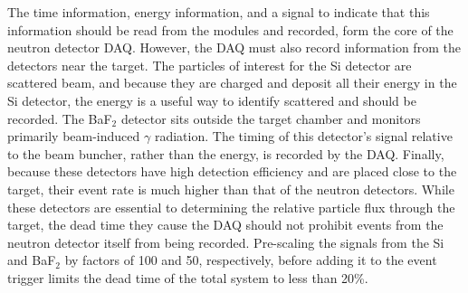 The time information, energy information, and a signal to indicate that this information should be read from the modules and recorded, form the core of the neutron detector DAQ.  However, the DAQ must also record information from the detectors near the target.  The particles of interest for the Si detector are scattered  beam, and because they are charged and deposit all their energy in the Si detector, the energy is a useful way to identify scattered  and should be recorded.  The BaF$_2$ detector sits outside the target chamber and monitors primarily beam-induced $\gamma$ radiation.  The timing of this detector's signal relative to the beam buncher, rather than the energy, is recorded by the DAQ.  Finally, because these detectors have high detection efficiency and are placed close to the target, their event rate is much higher than that of the neutron detectors.  While these detectors are essential to determining the relative particle flux through the target, the dead time they cause the DAQ should not prohibit events from the neutron detector itself from being recorded.  Pre-scaling the signals from the Si and BaF$_2$ by factors of 100 and 50, respectively, before adding it to the event trigger limits the dead time of the total system to less than 20\%.
